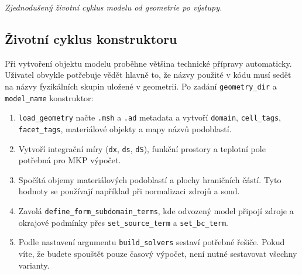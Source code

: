 \documentclass[a4paper,11pt]{article}
\begin{document}
\begin{center}
\par\smallskip
\small\emph{Zjednodušený životní cyklus modelu od geometrie po výstupy.}
\end{center}

\subsection*{Životní cyklus konstruktoru}

Při vytvoření objektu modelu proběhne většina technické přípravy automaticky.
Uživatel obvykle potřebuje vědět hlavně to, že názvy použité v kódu musí sedět
na názvy fyzikálních skupin uložené v geometrii. Po zadání \texttt{geometry\_dir}
a \texttt{model\_name} konstruktor:

\begin{enumerate}
  \item \texttt{load\_geometry} načte \texttt{.msh} a \texttt{.ad} metadata
        a vytvoří \texttt{domain}, \texttt{cell\_tags}, \texttt{facet\_tags},
        materiálové objekty a mapy názvů podoblastí.
  \item Vytvoří integrační míry (\texttt{dx}, \texttt{ds}, \texttt{dS}),
        funkční prostory a teplotní pole potřebná pro MKP výpočet.
  \item Spočítá objemy materiálových podoblastí a plochy hraničních částí.
        Tyto hodnoty se používají například při normalizaci zdrojů a sond.
  \item Zavolá \texttt{define\_form\_subdomain\_terms}, kde odvozený model
        připojí zdroje a okrajové podmínky přes \texttt{set\_source\_term} a
        \texttt{set\_bc\_term}.
  \item Podle nastavení argumentu \texttt{build\_solvers} sestaví potřebné řešiče. Pokud víte, že
        budete spouštět pouze časový výpočet, není nutné sestavovat všechny
        varianty.
\end{enumerate}
\end{document}
